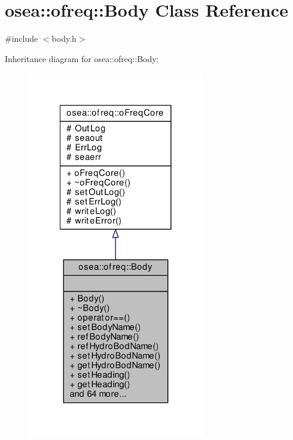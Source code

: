 \hypertarget{classosea_1_1ofreq_1_1_body}{\section{osea\-:\-:ofreq\-:\-:Body Class Reference}
\label{classosea_1_1ofreq_1_1_body}
}


{\ttfamily \#include $<$body.\-h$>$}



Inheritance diagram for osea\-:\-:ofreq\-:\-:Body\-:
\nopagebreak
\begin{figure}[H]
\begin{center}
\leavevmode
\includegraphics[width=218pt]{classosea_1_1ofreq_1_1_body__inherit__graph}
\end{center}
\end{figure}
